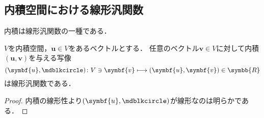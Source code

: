 \documentclass[../sotsu.tex]{subfiles}
\begin{document}
\subsection{内積空間における線形汎関数}

内積は線形汎関数の一種である．

\begin{proposition}
    $V$を内積空間，$\symbf{u} \in V$をあるベクトルとする．
    任意のベクトル$\symbf{v} \in V$に対して内積$(\symbf{u}, \symbf{v})$を与える写像
    \begin{equation}
        (\symbf{u}, \bigdot) \colon V \ni \symbf{v} \longmapsto (\symbf{u}, \symbf{v}) \in \symbb{R}
    \end{equation}
    は線形汎関数である．
\end{proposition}

\begin{proof}
    内積の線形性より$(\symbf{u}, \bigdot)$が線形なのは明らかである．
\end{proof}
\end{document}
